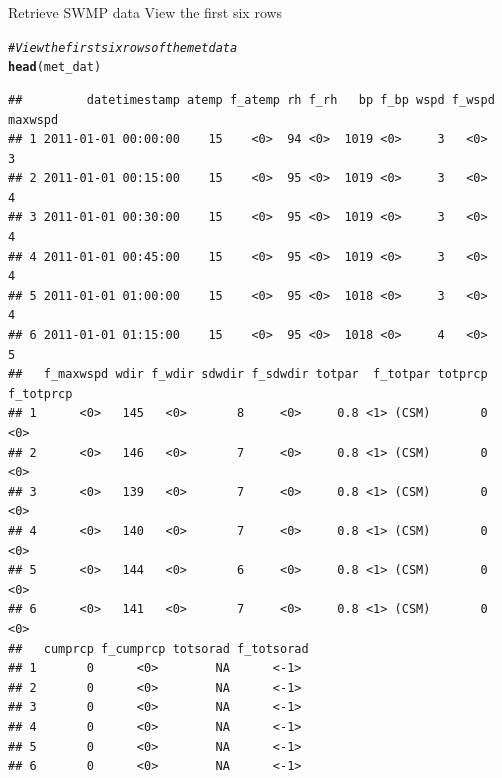 \documentclass[xcolor=svgnames]{beamer}\usepackage[]{graphicx}\usepackage[]{color}
\makeatletter
\newcommand{\hlcom}[1]{\textcolor[rgb]{0.678,0.584,0.686}{\textit{#1}}}%
\newcommand{\hlstd}[1]{\textcolor[rgb]{0.345,0.345,0.345}{#1}}%
\newcommand{\hlkwd}[1]{\textcolor[rgb]{0.737,0.353,0.396}{\textbf{#1}}}%
\newenvironment{kframe}{%
 \def\at@end@of@kframe{}%
 \ifinner\ifhmode%
  \def\at@end@of@kframe{\end{minipage}}%
  \begin{minipage}{\columnwidth}%
 \fi\fi%
 \def\FrameCommand##1{\hskip\@totalleftmargin \hskip-\fboxsep
 \colorbox{shadecolor}{##1}\hskip-\fboxsep
     \hskip-\linewidth \hskip-\@totalleftmargin \hskip\columnwidth}%
 \MakeFramed {\advance\hsize-\width
   \@totalleftmargin\z@ \linewidth\hsize
   \@setminipage}}%
 {\par\unskip\endMakeFramed%
 \at@end@of@kframe}
\newenvironment{knitrout}{}{} %
\makeatother
\begin{document}
\begin{frame}{Retrieve SWMP data}
View the first six rows
\begin{knitrout}\scriptsize
{}\color{fgcolor}\begin{kframe}
\begin{alltt}
\hlcom{# View the first six rows of the met data}
\hlkwd{head}\hlstd{(met_dat)}
\end{alltt}
\begin{verbatim}
##         datetimestamp atemp f_atemp rh f_rh   bp f_bp wspd f_wspd maxwspd
## 1 2011-01-01 00:00:00    15    <0>  94 <0>  1019 <0>     3   <0>        3
## 2 2011-01-01 00:15:00    15    <0>  95 <0>  1019 <0>     3   <0>        4
## 3 2011-01-01 00:30:00    15    <0>  95 <0>  1019 <0>     3   <0>        4
## 4 2011-01-01 00:45:00    15    <0>  95 <0>  1019 <0>     3   <0>        4
## 5 2011-01-01 01:00:00    15    <0>  95 <0>  1018 <0>     3   <0>        4
## 6 2011-01-01 01:15:00    15    <0>  95 <0>  1018 <0>     4   <0>        5
##   f_maxwspd wdir f_wdir sdwdir f_sdwdir totpar  f_totpar totprcp f_totprcp
## 1      <0>   145   <0>       8     <0>     0.8 <1> (CSM)       0      <0> 
## 2      <0>   146   <0>       7     <0>     0.8 <1> (CSM)       0      <0> 
## 3      <0>   139   <0>       7     <0>     0.8 <1> (CSM)       0      <0> 
## 4      <0>   140   <0>       7     <0>     0.8 <1> (CSM)       0      <0> 
## 5      <0>   144   <0>       6     <0>     0.8 <1> (CSM)       0      <0> 
## 6      <0>   141   <0>       7     <0>     0.8 <1> (CSM)       0      <0> 
##   cumprcp f_cumprcp totsorad f_totsorad
## 1       0      <0>        NA      <-1> 
## 2       0      <0>        NA      <-1> 
## 3       0      <0>        NA      <-1> 
## 4       0      <0>        NA      <-1> 
## 5       0      <0>        NA      <-1> 
## 6       0      <0>        NA      <-1>
\end{verbatim}
\end{kframe}
\end{knitrout}
\end{frame}
\end{document}
